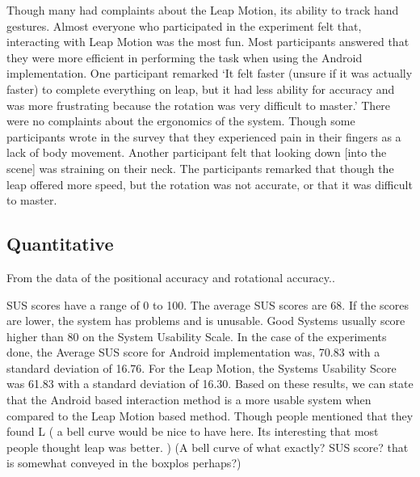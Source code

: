 Though many had complaints about the Leap Motion, its ability to track hand gestures.
Almost everyone who participated in the experiment felt that, interacting with Leap Motion was the most fun.
Most participants answered that they were more efficient in performing the task when using the Android implementation.
One participant remarked ‘It felt faster (unsure if it was actually faster) to complete everything on leap, but it had less ability for accuracy and was more frustrating because the rotation was very difficult to master.’
There were no complaints about the ergonomics of the system. Though some participants wrote in the survey that they experienced pain in their fingers as a lack of body movement. Another participant felt that looking down [into the scene] was straining on their neck. 
The participants remarked that though the leap offered more speed, but the rotation was not accurate, or that it was difficult to master.

\subsection{Quantitative}
From the data of the positional accuracy and rotational accuracy.. 

SUS scores have a range of 0 to 100. The average SUS scores are 68. If the scores are lower, the system has problems and is unusable. Good Systems usually score higher than 80 on the System Usability Scale.
In the case of the experiments done, the Average SUS score for Android implementation was, 70.83 with a standard deviation of 16.76. For the Leap Motion, the Systems Usability Score was 61.83 with a standard deviation of 16.30.
Based on these results, we can state that the Android based interaction method is a more usable system when compared to the Leap Motion based method. Though people mentioned that they found L ( a bell curve would be nice to have here. Its interesting that most people thought leap was better. )
(A bell curve of what exactly? SUS score? that is somewhat conveyed in the boxplos perhaps?)
\fi
